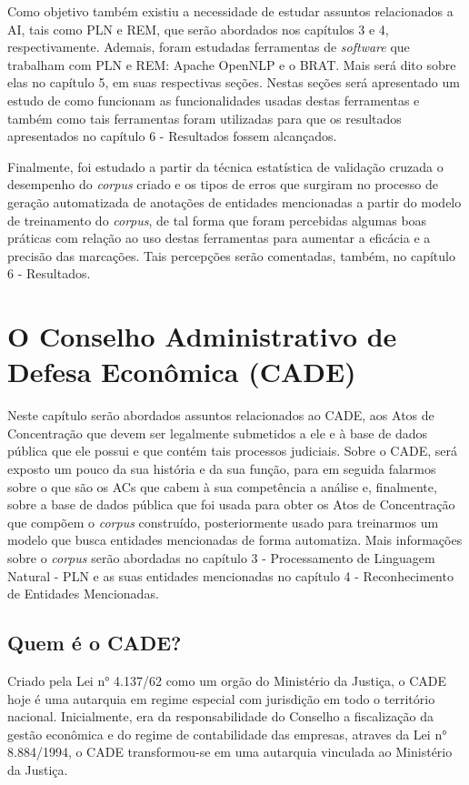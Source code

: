 \documentclass[11pt]{report}
\begin{document}
Como objetivo também existiu a necessidade de estudar assuntos relacionados a AI, tais como PLN e REM, que serão abordados nos capítulos 3 e 4, respectivamente.
Ademais, foram estudadas ferramentas de \textit{software} que trabalham com PLN e REM: Apache OpenNLP e o BRAT. Mais será dito sobre elas no capítulo 5, em suas
respectivas seções. Nestas seções será apresentado um estudo de como funcionam as funcionalidades usadas destas ferramentas e também como tais ferramentas foram
utilizadas para que os resultados apresentados no capítulo 6 - Resultados fossem alcançados.

Finalmente, foi estudado a partir da técnica estatística de validação cruzada o desempenho do \textit{corpus} criado e os tipos de erros que surgiram no processo de geração automatizada
de anotações de entidades mencionadas a partir do modelo de treinamento do \textit{corpus}, de tal forma que foram percebidas algumas boas práticas com relação ao uso destas ferramentas
para aumentar a eficácia e a precisão das marcações. Tais percepções serão comentadas, também, no capítulo 6 - Resultados.

\pagebreak
\chapter{O Conselho Administrativo de Defesa Econômica (CADE)}

\indent\indent Neste capítulo serão abordados assuntos relacionados ao CADE, aos Atos de Concentração que devem ser legalmente submetidos a ele e à base de dados pública que ele possui e
que contém tais processos judiciais. Sobre o CADE, será exposto um pouco da sua história e da sua função, para em seguida falarmos sobre o que são os ACs que cabem à sua competência
a análise e, finalmente, sobre a base de dados pública que foi usada para obter os Atos de Concentração que compõem o \textit{corpus} construído, posteriormente usado para treinarmos um modelo
que busca entidades mencionadas de forma automatiza. Mais informações sobre o \textit{corpus} serão abordadas no capítulo 3 - Processamento de Linguagem Natural - PLN e as suas entidades mencionadas no capítulo 4 - Reconhecimento de Entidades Mencionadas.

\section{Quem é o CADE?}

\indent\indent Criado pela Lei n° 4.137/62 como um orgão do Ministério da Justiça, o CADE hoje é uma autarquia em regime especial com jurisdição em todo o território nacional. Inicialmente,
era da responsabilidade do Conselho a fiscalização da gestão econômica e do regime de contabilidade das empresas, atraves da Lei n° 8.884/1994, o CADE transformou-se em uma
autarquia vinculada ao Ministério da Justiça.
\end{document}
